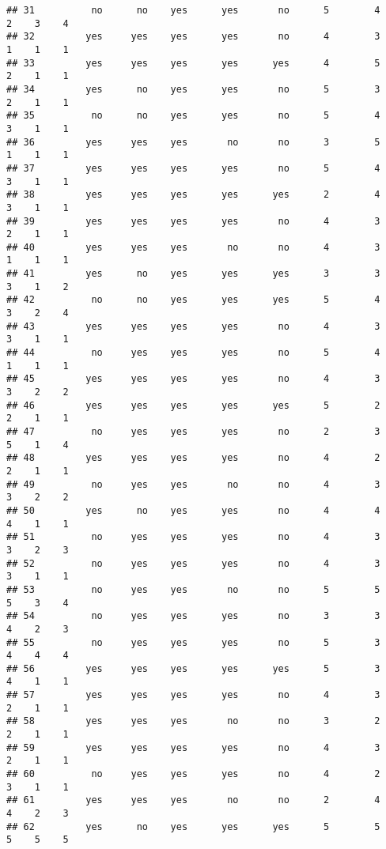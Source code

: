 \documentclass[
]{article}
\begin{document}
\begin{verbatim}
## 31          no      no    yes      yes       no      5        4     2    3    4
## 32         yes     yes    yes      yes       no      4        3     1    1    1
## 33         yes     yes    yes      yes      yes      4        5     2    1    1
## 34         yes      no    yes      yes       no      5        3     2    1    1
## 35          no      no    yes      yes       no      5        4     3    1    1
## 36         yes     yes    yes       no       no      3        5     1    1    1
## 37         yes     yes    yes      yes       no      5        4     3    1    1
## 38         yes     yes    yes      yes      yes      2        4     3    1    1
## 39         yes     yes    yes      yes       no      4        3     2    1    1
## 40         yes     yes    yes       no       no      4        3     1    1    1
## 41         yes      no    yes      yes      yes      3        3     3    1    2
## 42          no      no    yes      yes      yes      5        4     3    2    4
## 43         yes     yes    yes      yes       no      4        3     3    1    1
## 44          no     yes    yes      yes       no      5        4     1    1    1
## 45         yes     yes    yes      yes       no      4        3     3    2    2
## 46         yes     yes    yes      yes      yes      5        2     2    1    1
## 47          no     yes    yes      yes       no      2        3     5    1    4
## 48         yes     yes    yes      yes       no      4        2     2    1    1
## 49          no     yes    yes       no       no      4        3     3    2    2
## 50         yes      no    yes      yes       no      4        4     4    1    1
## 51          no     yes    yes      yes       no      4        3     3    2    3
## 52          no     yes    yes      yes       no      4        3     3    1    1
## 53          no     yes    yes       no       no      5        5     5    3    4
## 54          no     yes    yes      yes       no      3        3     4    2    3
## 55          no     yes    yes      yes       no      5        3     4    4    4
## 56         yes     yes    yes      yes      yes      5        3     4    1    1
## 57         yes     yes    yes      yes       no      4        3     2    1    1
## 58         yes     yes    yes       no       no      3        2     2    1    1
## 59         yes     yes    yes      yes       no      4        3     2    1    1
## 60          no     yes    yes      yes       no      4        2     3    1    1
## 61         yes     yes    yes       no       no      2        4     4    2    3
## 62         yes      no    yes      yes      yes      5        5     5    5    5

\end{verbatim}
\end{document}
